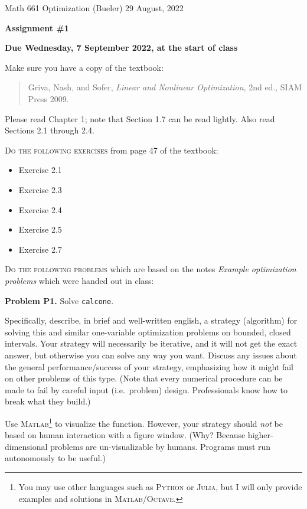 \documentclass[12pt]{amsart}
\newcommand{\Julia}{\textsc{Julia}\xspace}
\newcommand{\Matlab}{\textsc{Matlab}\xspace}
\newcommand{\Octave}{\textsc{Octave}\xspace}
\newcommand{\Python}{\textsc{Python}\xspace}
\newcommand{\prob}[1]{\bigskip\noindent\textbf{#1}\quad }
\begin{document}
\scriptsize \noindent Math 661 Optimization (Bueler) \hfill 29 August, 2022
\normalsize

\medskip\bigskip

\Large\centerline{\textbf{Assignment \#1}}
\large
\bigskip

\centerline{\textbf{Due Wednesday, 7 September 2022, at the start of class}}
\bigskip
\normalsize

\thispagestyle{empty}

\bigskip
\noindent Make sure you have a copy of the textbook:

\begin{quote}
Griva, Nash, and Sofer, \emph{Linear and Nonlinear Optimization}, 2nd ed., SIAM Press 2009.
\end{quote}

\noindent Please read Chapter 1; note that Section 1.7 can be read lightly.  Also read Sections 2.1 through 2.4.

\bigskip
\noindent \textsc{Do the following exercises} from page 47 of the textbook:

\begin{itemize}
\item Exercise 2.1
\item Exercise 2.3
\item Exercise 2.4
\item Exercise 2.5
\item Exercise 2.7
\end{itemize}


\bigskip
\noindent \textsc{Do the following problems} which are based on the notes \emph{Example optimization problems} which were handed out in class:

\medskip
\prob{Problem P1.}  Solve \texttt{calcone}.

Specifically, describe, in brief and well-written english, a strategy (algorithm) for solving this and similar one-variable optimization problems on bounded, closed intervals.  Your strategy will necessarily be iterative, and it will not get the exact answer, but otherwise you can solve any way you want.  Discuss any issues about the general performance/success of your strategy, emphasizing how it might fail on other problems of this type.  (Note that every numerical procedure can be made to fail by careful input (i.e.~problem) design.  Professionals know how to break what they build.)

Use \Matlab\footnote{You may use other languages such as \Python or \Julia, but I will only provide examples and solutions in \Matlab/\Octave.} to visualize the function.  However, your strategy should \emph{not} be based on human interaction with a figure window.  (Why?  Because higher-dimensional problems are un-visualizable by humans.  Programs must run autonomously to be useful.)
\end{document}
